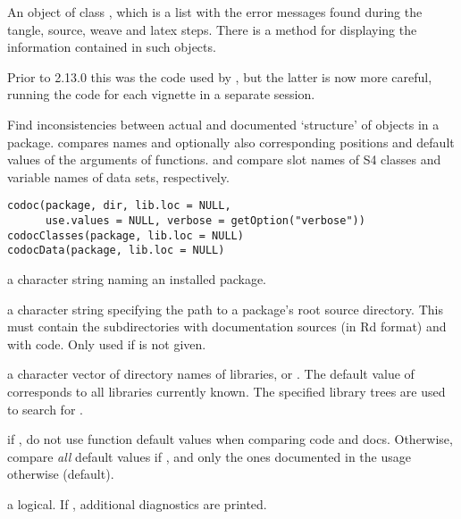 %
\begin{Value}
An object of class , which is a list with the
error messages found during the tangle, source, weave and latex
steps. There is a  method for displaying the
information contained in such objects.
\end{Value}
%
\begin{Note}\relax
Prior to \R{} 2.13.0 this was the code used by ,
but the latter is now more careful, running the code for each vignette
in a separate \R{} session.
\end{Note}
%
\begin{Description}\relax
Find inconsistencies between actual and documented `structure'
of \R{} objects in a package.   compares names and
optionally also corresponding positions and default values of the
arguments of functions.   and 
compare slot names of S4 classes and variable names of data sets,
respectively.
\end{Description}
%
\begin{Usage}
\begin{verbatim}
codoc(package, dir, lib.loc = NULL,
      use.values = NULL, verbose = getOption("verbose"))
codocClasses(package, lib.loc = NULL)
codocData(package, lib.loc = NULL)
\end{verbatim}
\end{Usage}
%
\begin{Arguments}
\begin{ldescription}
\item[\code{package}] a character string naming an installed package.
\item[\code{dir}] a character string specifying the path to a package's root
source directory.  This must contain the subdirectories 
with \R{} documentation sources (in Rd format) and  with \R{}
code.  Only used if  is not given.
\item[\code{lib.loc}] a character vector of directory names of \R{} libraries,
or .  The default value of  corresponds to all
libraries currently known.  The specified library trees are used to
search for .
\item[\code{use.values}] if , do not use function default values
when comparing code and docs.  Otherwise, compare \emph{all} default
values if , and only the ones documented in the usage
otherwise (default).
\item[\code{verbose}] a logical.  If , additional diagnostics are
printed.
\end{ldescription}
\end{Arguments}
